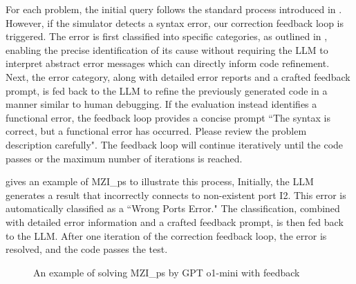 For each problem, the initial query follows the standard process introduced in .
However, if the simulator detects a syntax error, our correction feedback loop is triggered. 
The error is first classified into specific categories, as outlined in , enabling the precise identification of its cause without requiring the LLM to interpret abstract error messages which can directly inform code refinement. 
Next, the error category, along with detailed error reports and a crafted feedback prompt, is fed back to the LLM to refine the previously generated code in a manner similar to human debugging.
If the evaluation instead identifies a functional error, the feedback loop provides a concise prompt 
``The syntax is correct, but a functional error has occurred. Please review the problem description carefully". 
The feedback loop will continue iteratively until the code passes or the maximum number of iterations is reached.

 gives an example of MZI\_ps to illustrate this process,
Initially, the LLM generates a result that incorrectly connects to non-existent port I2. 
This error is automatically classified as a ``Wrong Ports Error." The classification, combined with detailed error information and a crafted feedback prompt, is then fed back to the LLM. 
After one iteration of the correction feedback loop, the error is resolved, and the code passes the test.

    \begin{figure}[!tb]
    \centering
      \caption{An example of solving MZI\_ps by GPT o1-mini with feedback}
      \label{fig:feedback}
    \end{figure}
